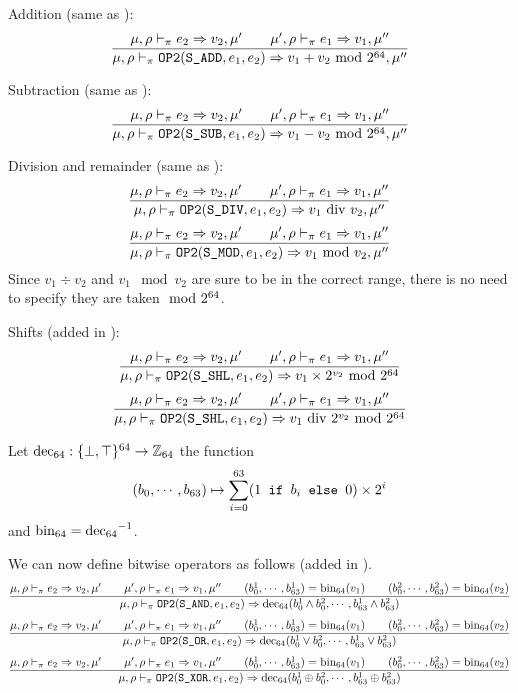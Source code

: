 Addition (same as \Cmm):
\[\dfrac{\mu,\rho\vdash_\pi e_2\Rightarrow v_2,\mu' \qquad \mu',\rho\vdash_\pi e_1\Rightarrow v_1,\mu''}{\mu,\rho\vdash_\pi \texttt{OP2}(\texttt{S\_ADD}, e_1, e_2) \Rightarrow v_1 + v_2\text{ mod } 2^{64},\mu''}\]

Subtraction (same as \Cmm):
\[\dfrac{\mu,\rho\vdash_\pi e_2\Rightarrow v_2,\mu' \qquad \mu',\rho\vdash_\pi e_1\Rightarrow v_1,\mu''}{\mu,\rho\vdash_\pi \texttt{OP2}(\texttt{S\_SUB}, e_1, e_2) \Rightarrow v_1 - v_2\text{ mod } 2^{64},\mu''}\]

Division and remainder (same as \Cmm):
\[\dfrac{\mu,\rho\vdash_\pi e_2\Rightarrow v_2,\mu' \qquad \mu',\rho\vdash_\pi e_1\Rightarrow v_1,\mu''}{\mu,\rho\vdash_\pi \texttt{OP2}(\texttt{S\_DIV}, e_1, e_2) \Rightarrow v_1 \text{ div } v_2,\mu''}\]
\[\dfrac{\mu,\rho\vdash_\pi e_2\Rightarrow v_2,\mu' \qquad \mu',\rho\vdash_\pi e_1\Rightarrow v_1,\mu''}{\mu,\rho\vdash_\pi \texttt{OP2}(\texttt{S\_MOD}, e_1, e_2) \Rightarrow v_1 \text{ mod } v_2,\mu''}\]
Since \(v_1 \div v_2\) and \(v_1 \mod v_2\) are sure to be in the correct range, there is no need to specify they are taken \(\text{ mod } 2^{64}\).

Shifts (added in \Cpm):
\[\dfrac{\mu,\rho\vdash_\pi e_2\Rightarrow v_2,\mu' \qquad \mu',\rho\vdash_\pi e_1\Rightarrow v_1,\mu''}{\mu,\rho\vdash_\pi \texttt{OP2}(\texttt{S\_SHL}, e_1, e_2) \Rightarrow v_1 \times 2^{v_2} \text{ mod } 2^{64}}\]
\[\dfrac{\mu,\rho\vdash_\pi e_2\Rightarrow v_2,\mu' \qquad \mu',\rho\vdash_\pi e_1\Rightarrow v_1,\mu''}{\mu,\rho\vdash_\pi \texttt{OP2}(\texttt{S\_SHL}, e_1, e_2) \Rightarrow v_1 \text{ div } 2^{v_2} \text{ mod } 2^{64}}\]



Let \(\operatorname{dec_{64}}: \{ \bot, \top \}^{64} \to \mathbb{Z}_{64}\) the function
\[(b_0, \cdots, b_{63}) \mapsto \sum_{i=0}^{63} (1\texttt{ if } b_i\texttt{ else }0)\times 2^i\]
and \(\operatorname{bin_{64}} = \operatorname{dec_{64}}^{-1}\).

We can now define bitwise operators as follows (added in \Cpm).\\
\[\dfrac{\mu,\rho\vdash_\pi e_2\Rightarrow v_2,\mu' \qquad \mu',\rho\vdash_\pi e_1\Rightarrow v_1,\mu'' \qquad (b_0^1,\cdots,b_{63}^1) = \operatorname{bin_{64}}(v_1) \qquad (b_0^2,\cdots,b_{63}^2) = \operatorname{bin_{64}}(v_2)}{\mu,\rho\vdash_\pi \texttt{OP2}(\texttt{S\_AND}, e_1, e_2) \Rightarrow \operatorname{dec_{64}}(b_0^1 \wedge b_0^2,\cdots, b_{63}^1 \wedge b_{63}^2)}\]
\[\dfrac{\mu,\rho\vdash_\pi e_2\Rightarrow v_2,\mu' \qquad \mu',\rho\vdash_\pi e_1\Rightarrow v_1,\mu'' \qquad (b_0^1,\cdots,b_{63}^1) = \operatorname{bin_{64}}(v_1) \qquad (b_0^2,\cdots,b_{63}^2) = \operatorname{bin_{64}}(v_2)}{\mu,\rho\vdash_\pi \texttt{OP2}(\texttt{S\_OR}, e_1, e_2) \Rightarrow \operatorname{dec_{64}}(b_0^1 \vee b_0^2,\cdots, b_{63}^1 \vee b_{63}^2)}\]
\[\dfrac{\mu,\rho\vdash_\pi e_2\Rightarrow v_2,\mu' \qquad \mu',\rho\vdash_\pi e_1\Rightarrow v_1,\mu'' \qquad (b_0^1,\cdots,b_{63}^1) = \operatorname{bin_{64}}(v_1) \qquad (b_0^2,\cdots,b_{63}^2) = \operatorname{bin_{64}}(v_2)}{\mu,\rho\vdash_\pi \texttt{OP2}(\texttt{S\_XOR}, e_1, e_2) \Rightarrow \operatorname{dec_{64}}(b_0^1 \oplus b_0^2,\cdots, b_{63}^1 \oplus b_{63}^2)}\]



